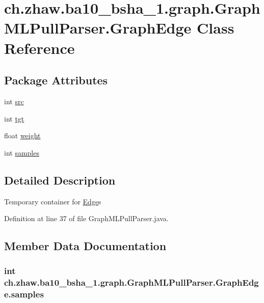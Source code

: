 \hypertarget{classch_1_1zhaw_1_1ba10__bsha__1_1_1graph_1_1GraphMLPullParser_1_1GraphEdge}{
\section{ch.zhaw.ba10\_\-bsha\_\-1.graph.GraphMLPullParser.GraphEdge Class Reference}
\label{classch_1_1zhaw_1_1ba10__bsha__1_1_1graph_1_1GraphMLPullParser_1_1GraphEdge}
}
\subsection*{Package Attributes}
\begin{DoxyCompactItemize}
\item 
int \hyperlink{classch_1_1zhaw_1_1ba10__bsha__1_1_1graph_1_1GraphMLPullParser_1_1GraphEdge_a8ddd9c31ff9cbe6303c70fa75c7c7a0f}{src}
\item 
int \hyperlink{classch_1_1zhaw_1_1ba10__bsha__1_1_1graph_1_1GraphMLPullParser_1_1GraphEdge_ab4607327cafc0923bb9b5d0ca34abe1e}{tgt}
\item 
float \hyperlink{classch_1_1zhaw_1_1ba10__bsha__1_1_1graph_1_1GraphMLPullParser_1_1GraphEdge_ab07b6563dfd9148c9097f29edd1e5e03}{weight}
\item 
int \hyperlink{classch_1_1zhaw_1_1ba10__bsha__1_1_1graph_1_1GraphMLPullParser_1_1GraphEdge_afd2781d31dd046e4ea2834ed475e8521}{samples}
\end{DoxyCompactItemize}


\subsection{Detailed Description}
Temporary container for \hyperlink{classch_1_1zhaw_1_1ba10__bsha__1_1_1graph_1_1Edge}{Edge}s 

Definition at line 37 of file GraphMLPullParser.java.

\subsection{Member Data Documentation}
\hypertarget{classch_1_1zhaw_1_1ba10__bsha__1_1_1graph_1_1GraphMLPullParser_1_1GraphEdge_afd2781d31dd046e4ea2834ed475e8521}{
\subsubsection[{samples}]{\setlength{\rightskip}{0pt plus 5cm}int {\bf ch.zhaw.ba10\_\-bsha\_\-1.graph.GraphMLPullParser.GraphEdge.samples}}}
\label{classch_1_1zhaw_1_1ba10__bsha__1_1_1graph_1_1GraphMLPullParser_1_1GraphEdge_afd2781d31dd046e4ea2834ed475e8521}


